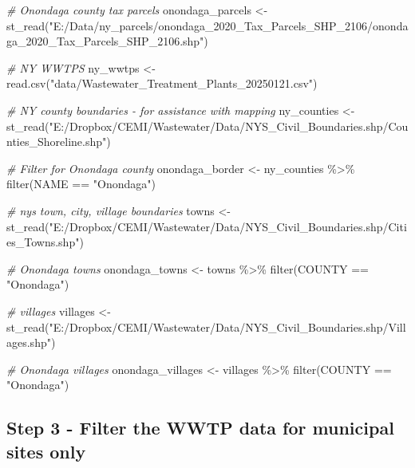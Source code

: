 \documentclass[
]{book}
\newenvironment{Shaded}{\begin{snugshade}}{\end{snugshade}}
\newcommand{\CommentTok}[1]{\textcolor[rgb]{0.56,0.35,0.01}{\textit{#1}}}
\newcommand{\FunctionTok}[1]{\textcolor[rgb]{0.00,0.00,0.00}{#1}}
\newcommand{\NormalTok}[1]{#1}
\newcommand{\OtherTok}[1]{\textcolor[rgb]{0.56,0.35,0.01}{#1}}
\newcommand{\SpecialCharTok}[1]{\textcolor[rgb]{0.00,0.00,0.00}{#1}}
\newcommand{\StringTok}[1]{\textcolor[rgb]{0.31,0.60,0.02}{#1}}
\begin{document}
\begin{Shaded}
\begin{Highlighting}[]
\CommentTok{\# Onondaga county tax parcels}
\NormalTok{onondaga\_parcels }\OtherTok{\textless{}{-}} 
  \FunctionTok{st\_read}\NormalTok{(}\StringTok{"E:/Data/ny\_parcels/onondaga\_2020\_Tax\_Parcels\_SHP\_2106/onondaga\_2020\_Tax\_Parcels\_SHP\_2106.shp"}\NormalTok{)}

\CommentTok{\# NY WWTPS}
\NormalTok{ny\_wwtps }\OtherTok{\textless{}{-}} \FunctionTok{read.csv}\NormalTok{(}\StringTok{"data/Wastewater\_Treatment\_Plants\_20250121.csv"}\NormalTok{)}

\CommentTok{\# NY county boundaries {-} for assistance with mapping}
\NormalTok{ny\_counties }\OtherTok{\textless{}{-}} 
  \FunctionTok{st\_read}\NormalTok{(}\StringTok{"E:/Dropbox/CEMI/Wastewater/Data/NYS\_Civil\_Boundaries.shp/Counties\_Shoreline.shp"}\NormalTok{)}

\CommentTok{\# Filter for Onondaga county}
\NormalTok{onondaga\_border }\OtherTok{\textless{}{-}}\NormalTok{ ny\_counties }\SpecialCharTok{\%\textgreater{}\%}
  \FunctionTok{filter}\NormalTok{(NAME }\SpecialCharTok{==} \StringTok{"Onondaga"}\NormalTok{)}

\CommentTok{\# nys town, city, village boundaries}
\NormalTok{towns }\OtherTok{\textless{}{-}} 
  \FunctionTok{st\_read}\NormalTok{(}\StringTok{"E:/Dropbox/CEMI/Wastewater/Data/NYS\_Civil\_Boundaries.shp/Cities\_Towns.shp"}\NormalTok{)}

\CommentTok{\# Onondaga towns}
\NormalTok{onondaga\_towns }\OtherTok{\textless{}{-}}\NormalTok{ towns }\SpecialCharTok{\%\textgreater{}\%}
  \FunctionTok{filter}\NormalTok{(COUNTY }\SpecialCharTok{==} \StringTok{"Onondaga"}\NormalTok{)}

\CommentTok{\# villages}
\NormalTok{villages }\OtherTok{\textless{}{-}} 
  \FunctionTok{st\_read}\NormalTok{(}\StringTok{"E:/Dropbox/CEMI/Wastewater/Data/NYS\_Civil\_Boundaries.shp/Villages.shp"}\NormalTok{)}

\CommentTok{\# Onondaga villages}
\NormalTok{onondaga\_villages }\OtherTok{\textless{}{-}}\NormalTok{ villages }\SpecialCharTok{\%\textgreater{}\%}
  \FunctionTok{filter}\NormalTok{(COUNTY }\SpecialCharTok{==} \StringTok{"Onondaga"}\NormalTok{)}
\end{Highlighting}
\end{Shaded}

\hypertarget{step-3---filter-the-wwtp-data-for-municipal-sites-only}{%
\subsection{Step 3 - Filter the WWTP data for municipal sites only}\label{step-3---filter-the-wwtp-data-for-municipal-sites-only}}
\end{document}
